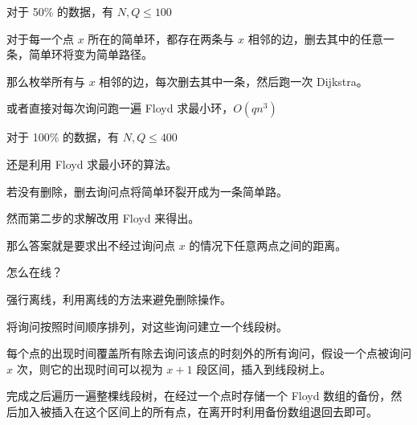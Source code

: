 对于 50\% 的数据，有 $N,Q \le 100$

对于每一个点 $x$ 所在的简单环，都存在两条与 $x$ 相邻的边，删去其中的任意一条，简单环将变为简单路径。

那么枚举所有与 $x$ 相邻的边，每次删去其中一条，然后跑一次 Dijkstra。

或者直接对每次询问跑一遍 Floyd 求最小环，$O(qn^3)$

对于 100\% 的数据，有 $N,Q \le 400$

还是利用 Floyd 求最小环的算法。

若没有删除，删去询问点将简单环裂开成为一条简单路。

然而第二步的求解改用 Floyd 来得出。

那么答案就是要求出不经过询问点 $x$ 的情况下任意两点之间的距离。

怎么在线？

强行离线，利用离线的方法来避免删除操作。

将询问按照时间顺序排列，对这些询问建立一个线段树。

每个点的出现时间覆盖所有除去询问该点的时刻外的所有询问，假设一个点被询问 $x$ 次，则它的出现时间可以视为 $x + 1$ 段区间，插入到线段树上。

完成之后遍历一遍整棵线段树，在经过一个点时存储一个 Floyd 数组的备份，然后加入被插入在这个区间上的所有点，在离开时利用备份数组退回去即可。
